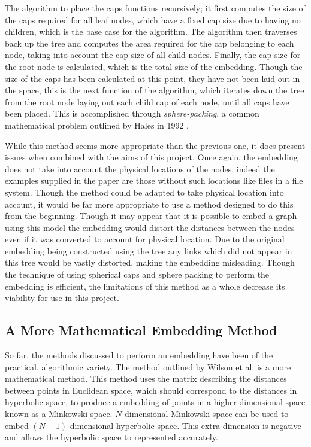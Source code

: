 The algorithm to place the caps functions recursively; it first computes the size of the caps required for all leaf nodes, which have a fixed cap size due to having no children, which is the base case for the algorithm. The algorithm then traverses back up the tree and computes the area required for the cap belonging to each node, taking into account the cap size of all child nodes. Finally, the cap size for the root node is calculated, which is the total size of the embedding. Though the size of the caps has been calculated at this point, they have not been laid out in the space, this is the next function of the algorithm, which iterates down the tree from the root node laying out each child cap of each node, until all caps have been placed. This is accomplished through \textit{sphere-packing}, a common mathematical problem outlined by Hales in 1992 \cite{hales_sphere_1992}.

While this method seems more appropriate than the previous one, it does present issues when combined with the aims of this project. Once again, the embedding does not take into account the physical locations of the nodes, indeed the examples supplied in the paper are those without such locations like files in a file system. Though the method could be adapted to take physical location into account, it would be far more appropriate to use a method designed to do this from the beginning. Though it may appear that it is possible to embed a graph using this model the embedding would distort the distances between the nodes even if it was converted to account for physical location. Due to the original embedding being constructed using the tree any links which did not appear in this tree would be vastly distorted, making the embedding misleading. Though the technique of using spherical caps and sphere packing to perform the embedding is efficient, the limitations of this method as a whole decrease its viability for use in this project.

\subsection{A More Mathematical Embedding Method}
\label{sec:hyperbolic_embedding}

So far, the methods discussed to perform an embedding have been of the practical, algorithmic variety. The method outlined by Wilson et al. \cite{wilson_spherical_2014} is a more mathematical method. This method uses the matrix describing the distances between points in Euclidean space, which should correspond to the distances in hyperbolic space, to produce a embedding of points in a higher dimensional space known as a Minkowski space. $N$-dimensional Minkowski space can be used to embed $(N-1)$-dimensional hyperbolic space. This extra dimension is negative and allows the hyperbolic space to represented accurately.

